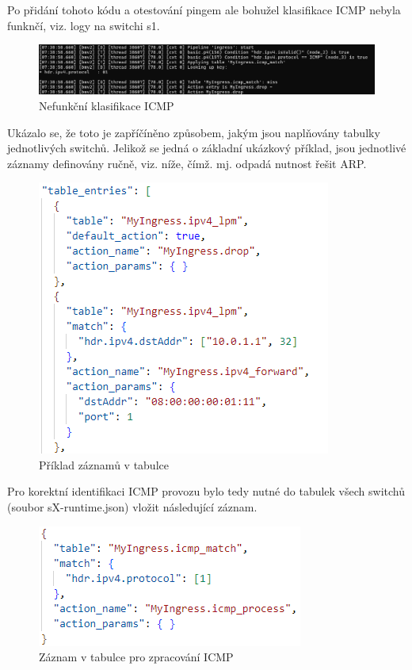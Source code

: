 \documentclass[czech, 11pt]{article}
\begin{document}
    Po přidání tohoto kódu a otestování pingem ale bohužel klasifikace ICMP nebyla funknčí, viz. logy na switchi s1.
    \begin{figure}[H]
		\centering
		\includegraphics[width=\textwidth,height=\textheight,keepaspectratio]{logy_miss.png}
		\caption{Nefunkční klasifikace ICMP}
		\label{obrazek2}
	\end{figure}

    Ukázalo se, že toto je zapříčíněno způsobem, jakým jsou naplňovány tabulky jednotlivých switchů. Jelikož se jedná o základní ukázkový příklad, jsou jednotlivé záznamy definovány ručně, viz. níže, čímž. mj. odpadá nutnost řešit ARP.

    \begin{figure}[H]
		\centering
		\includegraphics[width=.55\textwidth,height=\textheight,keepaspectratio]{Figures/tabulka_priklad.png}
		\caption{Příklad záznamů v tabulce}
		\label{obrazek2}
	\end{figure}

    Pro korektní identifikaci ICMP provozu bylo tedy nutné do tabulek všech switchů (soubor sX-runtime.json) vložit následující záznam.

    \begin{figure}[H]
		\centering
		\includegraphics[width=.55\textwidth,height=\textheight,keepaspectratio]{Figures/icmp_zaznam.png}
		\caption{Záznam v tabulce pro zpracování ICMP}
		\label{obrazek2}
	\end{figure}
\end{document}

